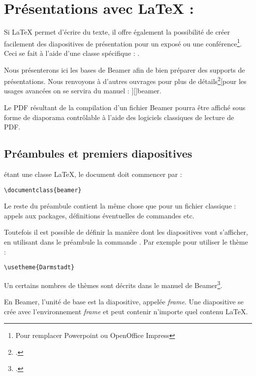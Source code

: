 \chapter{Présentations avec \LaTeX{} : }\label{beamer}

\begin{prealable}
Si \LaTeX{} permet d'écrire du texte, il offre également la possibilité de créer facilement des diapositives de présentation pour un exposé ou une conférence\footnote{Pour remplacer Powerpoint ou OpenOffice Impress}. Ceci se fait à l'aide d'une classe spécifique : .

Nous présenterons ici les bases de Beamer afin de bien préparer des supports de présentations. Nous renvoyons à d'autres ouvrages pour plus de détails\footcite[On consultera pour une introduction plus approfondie][]{intro_beamer}[pour les usages avancées on se servira du manuel : ][]{beamer}.

Le PDF résultant de la compilation d'un fichier Beamer pourra être affiché sous forme de diaporama contrôlable à l'aide des logiciels classiques de lecture de PDF.
\end{prealable}

\section{Préambules et premiers diapositives}

 étant une classe \LaTeX{}, le document doit commencer par :

\begin{verbatim}
\documentclass{beamer}
\end{verbatim}

Le reste du préambule contient la même chose que pour un fichier  classique : appels aux packages, définitions éventuelles de commandes etc.

Toutefois il est possible de définir la manière dont les diapositives vont s'afficher, en utilisant dans le préambule la commande . Par exemple pour utiliser le thème  :

\begin{verbatim}
\usetheme{Darmstadt}
\end{verbatim}

Un certains nombres de thèmes sont décrits dans le manuel de Beamer\footcite{beamer_theme}.

En Beamer, l'unité de base  est la diapositive, appelée \textenglish{\emph{frame}}. Une diapositive se crée avec l'environnement \emph{frame} et peut contenir n'importe quel contenu \LaTeX{}.

